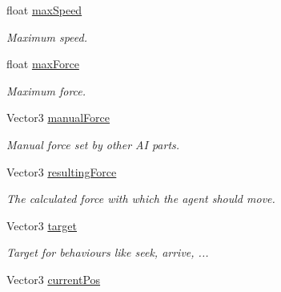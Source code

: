 \begin{DoxyCompactItemize}
\item 
\hypertarget{classAIMovementController_a9d69a734a62aa7fdad70dba727970a6d}{
float \hyperlink{classAIMovementController_a9d69a734a62aa7fdad70dba727970a6d}{max\-Speed}}
\label{d2/d30/classAIMovementController_a9d69a734a62aa7fdad70dba727970a6d}

\begin{DoxyCompactList}\small\item\em \-Maximum speed. \end{DoxyCompactList}\item 
\hypertarget{classAIMovementController_add1da64ae7c6fab79fb418b15c7fe72b}{
float \hyperlink{classAIMovementController_add1da64ae7c6fab79fb418b15c7fe72b}{max\-Force}}
\label{d2/d30/classAIMovementController_add1da64ae7c6fab79fb418b15c7fe72b}

\begin{DoxyCompactList}\small\item\em \-Maximum force. \end{DoxyCompactList}\item 
\hypertarget{classAIMovementController_a045109cbf4b5de5ce40eb7c77412e520}{
\-Vector3 \hyperlink{classAIMovementController_a045109cbf4b5de5ce40eb7c77412e520}{manual\-Force}}
\label{d2/d30/classAIMovementController_a045109cbf4b5de5ce40eb7c77412e520}

\begin{DoxyCompactList}\small\item\em \-Manual force set by other \-A\-I parts. \end{DoxyCompactList}\item 
\hypertarget{classAIMovementController_a5abc9cc99ff9bfd4db39e80b09651274}{
\-Vector3 \hyperlink{classAIMovementController_a5abc9cc99ff9bfd4db39e80b09651274}{resulting\-Force}}
\label{d2/d30/classAIMovementController_a5abc9cc99ff9bfd4db39e80b09651274}

\begin{DoxyCompactList}\small\item\em \-The calculated force with which the agent should move. \end{DoxyCompactList}\item 
\hypertarget{classAIMovementController_a2cb43e63ec6273c18ba6bb527ee57324}{
\-Vector3 \hyperlink{classAIMovementController_a2cb43e63ec6273c18ba6bb527ee57324}{target}}
\label{d2/d30/classAIMovementController_a2cb43e63ec6273c18ba6bb527ee57324}

\begin{DoxyCompactList}\small\item\em \-Target for behaviours like seek, arrive, ... \end{DoxyCompactList}\item 
\hypertarget{classAIMovementController_a27ebd50119b0af0964353b29b1f3a3c1}{
\-Vector3 \hyperlink{classAIMovementController_a27ebd50119b0af0964353b29b1f3a3c1}{current\-Pos}}
\label{d2/d30/classAIMovementController_a27ebd50119b0af0964353b29b1f3a3c1}


\end{DoxyCompactItemize}
